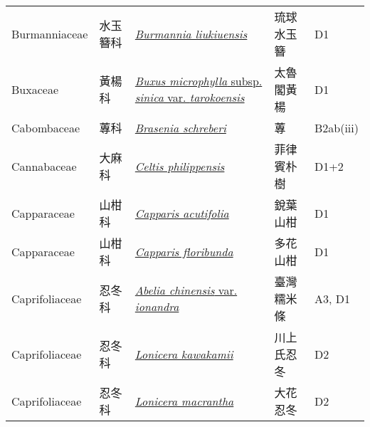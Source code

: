{\begin{longtable}{p{2.5cm}p{2cm}p{5cm}p{2.5cm}p{3cm}}
    Burmanniaceae & 水玉簪科 & \href{http://www.theplantlist.org/tpl1.1/search?q=Burmannia+liukiuensis}{\textit{Burmannia liukiuensis} } & 琉球水玉簪 & D1 \index{Burmannia@\textit{Burmannia}!liukiuensis@\textit{liukiuensis}}  \index{琉球水玉簪} \\
    Buxaceae & 黃楊科 & \href{http://www.theplantlist.org/tpl1.1/search?q=Buxus+microphylla+subsp.+sinica+var.+tarokoensis}{\textit{Buxus microphylla} subsp. \textit{sinica} var. \textit{tarokoensis} } & 太魯閣黃楊 & D1 \index{Buxus@\textit{Buxus}!microphylla@\textit{microphylla}!subsp. sinica@subsp. \textit{sinica}!var. tarokoensis@var. \textit{tarokoensis}}  \index{太魯閣黃楊} \\
    Cabombaceae & 蓴科 & \href{http://www.theplantlist.org/tpl1.1/search?q=Brasenia+schreberi}{\textit{Brasenia schreberi} } & 蓴 & B2ab(iii) \index{Brasenia@\textit{Brasenia}!schreberi@\textit{schreberi}}  \index{蓴} \\
    Cannabaceae & 大麻科 & \href{http://www.theplantlist.org/tpl1.1/search?q=Celtis+philippensis}{\textit{Celtis philippensis} } & 菲律賓朴樹 & D1+2 \index{Celtis@\textit{Celtis}!philippensis@\textit{philippensis}}  \index{菲律賓朴樹} \\
    Capparaceae & 山柑科 & \href{http://www.theplantlist.org/tpl1.1/search?q=Capparis+acutifolia}{\textit{Capparis acutifolia} } & 銳葉山柑 & D1 \index{Capparis@\textit{Capparis}!acutifolia@\textit{acutifolia}}  \index{銳葉山柑} \\
    Capparaceae & 山柑科 & \href{http://www.theplantlist.org/tpl1.1/search?q=Capparis+floribunda}{\textit{Capparis floribunda} } & 多花山柑 & D1 \index{Capparis@\textit{Capparis}!floribunda@\textit{floribunda}}  \index{多花山柑} \\
    Caprifoliaceae & 忍冬科 & \href{http://www.theplantlist.org/tpl1.1/search?q=Abelia+chinensis+var.+ionandra}{\textit{Abelia chinensis} var. \textit{ionandra} } & 臺灣糯米條 & A3, D1 \index{Abelia@\textit{Abelia}!chinensis@\textit{chinensis}!var. ionandra@var. \textit{ionandra}}  \index{臺灣糯米條} \\
    Caprifoliaceae & 忍冬科 & \href{http://www.theplantlist.org/tpl1.1/search?q=Lonicera+kawakamii}{\textit{Lonicera kawakamii} } & 川上氏忍冬 & D2 \index{Lonicera@\textit{Lonicera}!kawakamii@\textit{kawakamii}}  \index{川上氏忍冬} \\
    Caprifoliaceae & 忍冬科 & \href{http://www.theplantlist.org/tpl1.1/search?q=Lonicera+macrantha}{\textit{Lonicera macrantha} } & 大花忍冬 & D2 \index{Lonicera@\textit{Lonicera}!macrantha@\textit{macrantha}}  \index{大花忍冬} \\

\end{longtable}}
